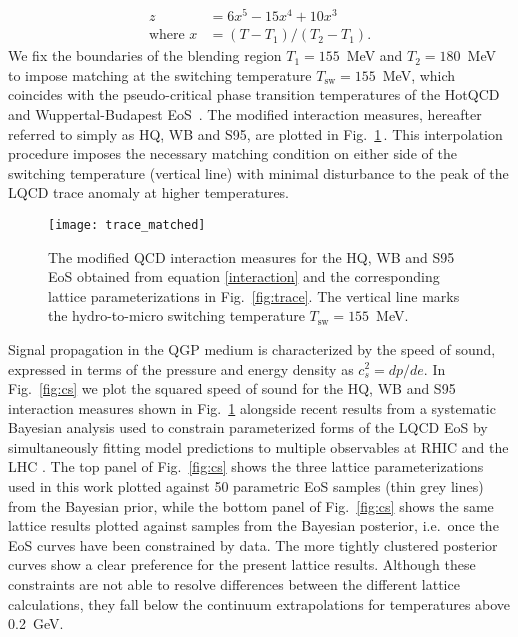 \documentclass[aps,prc,reprint,amsmath,nofootinbib,superscriptaddress]{revtex4-1}
\begin{document}
\begin{align}
 \label{smoothstep}
  z &= 6 x^5 - 15 x^4 + 10 x^3 \\
  \text{where } x &= (T - T_1)/(T_2 - T_1).
\end{align}
We fix the boundaries of the blending region $T_1=155$~MeV and $T_2=180$~MeV to impose matching at the switching temperature $T_\text{sw} = 155$~MeV, which coincides with the pseudo-critical phase transition temperatures of the HotQCD and Wuppertal-Budapest EoS~\cite{Borsanyi:2010gc,Bazavov:2012iu,Bhattacharya:2014iw}. The modified interaction measures, hereafter referred to simply as HQ, WB and S95, are plotted in Fig.~\ref{fig:trace_final}\,. This interpolation procedure imposes the necessary matching condition on either side of the switching temperature (vertical line) with minimal disturbance to the peak of the LQCD trace anomaly at higher temperatures.

\begin{figure}[t]
  \texttt{[image: trace\_matched]}
  \caption{\label{fig:trace_final} The modified QCD interaction measures for the HQ, WB and S95 EoS obtained from equation \eqref{interaction} and the corresponding lattice
	  parameterizations in Fig.~\ref{fig:trace}. The vertical line marks the hydro-to-micro switching temperature $T_\text{sw} = 155$~MeV.}
\end{figure}

Signal propagation in the QGP medium is characterized by the speed of sound, expressed in terms of the pressure and energy density as $c_s^2 = dp/de$.
In Fig.~\ref{fig:cs} we plot the squared speed of sound for the HQ, WB and S95 interaction measures shown in Fig.~\ref{fig:trace_final} alongside recent results from a systematic Bayesian analysis used to constrain parameterized forms of the LQCD EoS by simultaneously fitting model predictions to multiple observables at RHIC and the LHC \cite{Pratt:2015zsa}. 
The top panel of Fig.~\ref{fig:cs} shows the three lattice parameterizations used in this work plotted against 50 parametric EoS samples (thin grey lines) from the Bayesian prior, while the bottom panel of Fig.~\ref{fig:cs} shows the same lattice results plotted against samples from the Bayesian posterior, i.e.\ once the EoS curves have been constrained by data. The more tightly clustered posterior curves show a clear preference for the present lattice results.  Although these constraints are not able to resolve differences between the different lattice calculations, they fall below the continuum extrapolations for temperatures above 0.2~GeV.
\end{document}
